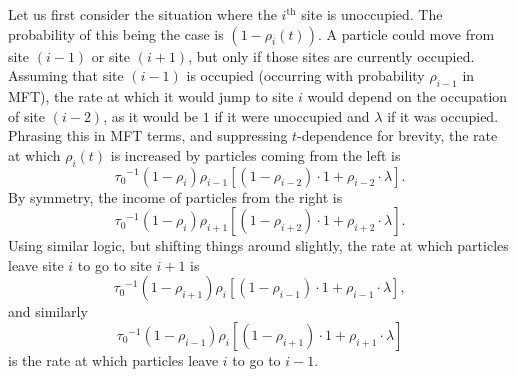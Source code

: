 Let us first consider the situation where the $i^\mathrm{th}$ site is unoccupied. The probability of this being the case is $(1-\rho_i (t))$. A particle could move from site $(i-1)$ or site $(i+1)$, but only if those sites are currently occupied.
Assuming that site $(i-1)$ is occupied (occurring with probability $\rho_{i-1}$ in MFT), the rate at which it would jump to site $i$ would depend on the occupation of site $(i-2)$,
as it would be $1$ if it were unoccupied and $\lambda$ if it was occupied. Phrasing this in MFT terms,
and suppressing $t$-dependence for brevity, the rate at which $\rho_i (t)$ is increased by particles coming from the left is
\begin{equation}
{\tau_0}^{-1} \left(1-\rho_i \right) \rho_{i-1} \left[ \left(1-\rho_{i-2} \right) \cdot 1  +   \rho_{i-2} \cdot \lambda \right].
\end{equation}
By symmetry, the income of particles from the right is
\begin{equation}
{\tau_0}^{-1} \left(1-\rho_i \right) \rho_{i+1} \left[ \left(1-\rho_{i+2} \right) \cdot 1  +   \rho_{i+2} \cdot \lambda \right].
\end{equation}
Using similar logic, but shifting things around slightly, the rate at which particles leave site $i$ to go to site $i+1$ is
\begin{equation}
{\tau_0}^{-1} \left(1-\rho_{i+1} \right) \rho_{i} \left[ \left(1-\rho_{i-1} \right) \cdot 1  +   \rho_{i-1} \cdot \lambda \right],
\end{equation}
and similarly 
\begin{equation}
{\tau_0}^{-1} \left(1-\rho_{i-1} \right) \rho_{i} \left[ \left(1-\rho_{i+1} \right) \cdot 1  +   \rho_{i+1} \cdot \lambda \right]
\end{equation}
is the rate at which particles leave $i$ to go to $i-1$.

